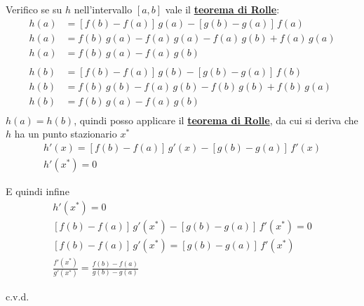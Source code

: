 \documentclass[../../analisi1]{subfiles}
\begin{document}
            Verifico se su \(h\) nell'intervallo \([a,b]\) vale il \textbf{\hyperref[teoRolle]{teorema di Rolle}}:
            \begin{align*}
                h(a)&=\left[f(b) - f(a)\right] \, g(a) - \left[g(b) - g(a)\right] \, f(a)\\
                h(a)&=f(b) \, g(a) - f(a) \, g(a) - f(a) \, g(b) + f(a) \, g(a)\\
                h(a)&=f(b) \, g(a) - f(a) \, g(b)\\
                \\
                h(b)&=\left[f(b) - f(a)\right] \, g(b) - \left[g(b) - g(a)\right] \, f(b)\\
                h(b)&=f(b) \, g(b) - f(a) \, g(b) - f(b) \, g(b) + f(b) \, g(a)\\
                h(b)&=f(b) \, g(a) - f(a) \, g(b)\\
            \end{align*}
            \(h(a)=h(b)\), quindi posso applicare il \textbf{\hyperref[teoRolle]{teorema di Rolle}}, da cui si deriva che \(h\) ha un punto stazionario \(x^*\)
            \begin{gather*}
                h'(x) = \left[f(b) - f(a)\right] \, g'(x) - \left[g(b) - g(a)\right] \, f'(x)\\
                h'(x^*) = 0    
            \end{gather*}

            E quindi infine
            \begin{gather*}
                h'(x^*) = 0\\
            \left[f(b) - f(a)\right] \, g'(x^*) - \left[g(b) - g(a)\right] \, f'(x^*) = 0\\
            \left[f(b) - f(a)\right] \, g'(x^*) = \left[g(b) - g(a)\right] \, f'(x^*)\\
            \frac{ f'(x^*) }{ g'(x^*) } = \frac{ f(b) - f(a) }{ g(b) - g(a) }
            \end{gather*}
            
            c.v.d.
\end{document}

